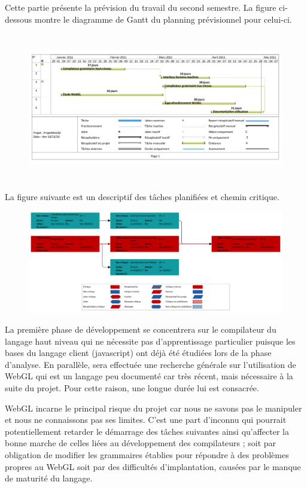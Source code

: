 
Cette partie présente la prévision du travail du second semestre. La figure ci-dessous montre le diagramme de Gantt du planning prévisionnel pour celui-ci.

\begin{figure}[h]
 \centering
 \includegraphics[width=\textwidth,height=6.5cm]{strategie/diag_gantt}
\end{figure}

La figure suivante est un descriptif des tâches planifiées et chemin critique.

\begin{figure}[h]
 \centering
 \includegraphics[width=\textwidth]{strategie/org_desc_tach}
\end{figure}

La première phase de développement se concentrera sur le compilateur du langage haut niveau qui ne nécessite pas d’apprentissage particulier 
puisque les bases du langage client (javascript) ont déjà été  étudiées lors de la phase d’analyse. 
En parallèle, sera effectuée une recherche générale sur l’utilisation de WebGL qui est un langage peu documenté car très récent, 
mais nécessaire à la suite du projet. Pour cette raison, une longue durée lui est consacrée.


WebGL incarne le principal risque du projet car nous ne savons pas le manipuler et nous ne connaissons pas ses limites.
 C’est une part d’inconnu qui pourrait potentiellement retarder le démarrage des tâches suivantes ainsi qu’affecter la bonne marche de celles 
liées au développement des compilateurs ; soit par obligation de modifier les grammaires établies pour répondre à des problèmes propres au WebGL 
soit par des difficultés d’implantation, causées par le manque de maturité du langage.

